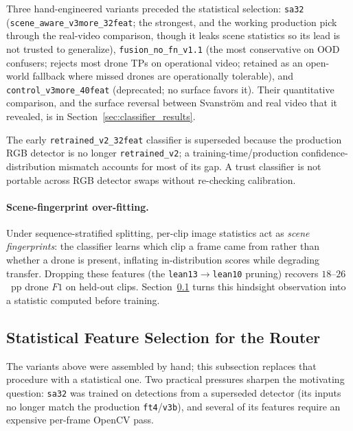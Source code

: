 Three hand-engineered variants preceded the statistical selection: \texttt{sa32} (\texttt{scene\_aware\_\allowbreak v3more\_\allowbreak 32feat}; the strongest, and the working production pick through the real-video comparison, though it leaks scene statistics so its lead is not trusted to generalize), \texttt{fusion\_no\_fn\_v1.1} (the most conservative on OOD confusers; rejects most drone TPs on operational video; retained as an open-world fallback where missed drones are operationally tolerable), and \texttt{control\_\allowbreak v3more\_\allowbreak 40feat} (deprecated; no surface favors it). Their quantitative comparison, and the surface reversal between Svanstr\"om and real video that it revealed, is in Section~\ref{sec:classifier_results}.

The early \texttt{retrained\_v2\_32feat} classifier is superseded because the production RGB detector is no longer \texttt{retrained\_v2}; a training-time/production confidence-distribution mismatch accounts for most of its gap. A trust classifier is not portable across RGB detector swaps without re-checking calibration.

\paragraph{Scene-fingerprint over-fitting.}
Under sequence-stratified splitting, per-clip image statistics act as \emph{scene fingerprints}: the classifier learns which clip a frame came from rather than whether a drone is present, inflating in-distribution scores while degrading transfer. Dropping these features (the \texttt{lean13}$\to$\texttt{lean10} pruning) recovers $18$--$26$~pp drone $F1$ on held-out clips. Section~\ref{sec:feature_selection} turns this hindsight observation into a statistic computed before training.

\subsection{Statistical Feature Selection for the Router}
\label{sec:feature_selection}

The variants above were assembled by hand; this subsection replaces that procedure with a statistical one. Two practical pressures sharpen the motivating question: \texttt{sa32} was trained on detections from a superseded detector (its inputs no longer match the production \texttt{ft4}/\texttt{v3b}), and several of its features require an expensive per-frame OpenCV pass.

